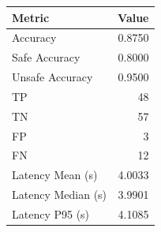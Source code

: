 \begin{table}[ht]
\centering
\begin{tabular}{lr}
\toprule
Metric & Value \\
\midrule
Accuracy & 0.8750 \\
Safe Accuracy & 0.8000 \\
Unsafe Accuracy & 0.9500 \\
TP & 48 \\
TN & 57 \\
FP & 3 \\
FN & 12 \\
Latency Mean (s) & 4.0033 \\
Latency Median (s) & 3.9901 \\
Latency P95 (s) & 4.1085 \\
\bottomrule
\end{tabular}
\end{table}